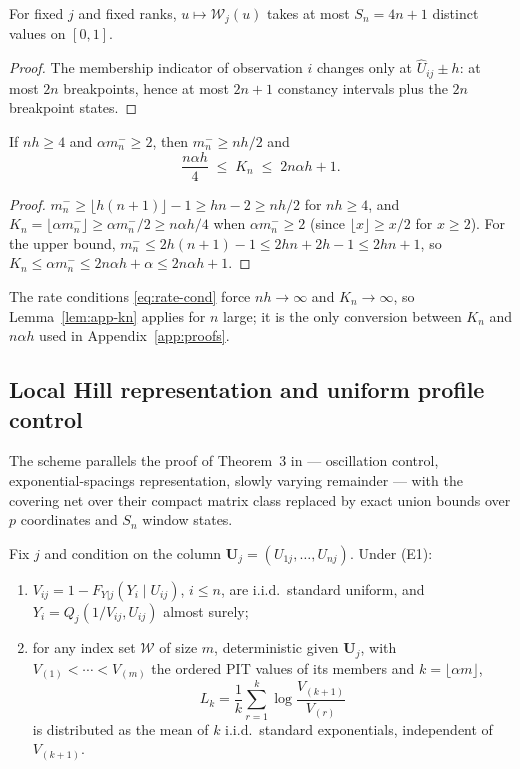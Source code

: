 \begin{lemma}\label{lem:app-states}
For fixed $j$ and fixed ranks, $u\mapsto\mathcal W_j(u)$ takes at most
$S_n=4n+1$ distinct values on $[0,1]$.
\end{lemma}

\begin{proof}
The membership indicator of observation $i$ changes only at
$\widehat U_{ij}\pm h$: at most $2n$ breakpoints, hence at most $2n+1$
constancy intervals plus the $2n$ breakpoint states.
\end{proof}

\begin{lemma}\label{lem:app-kn}
If $nh\ge4$ and $\alpha m_n^-\ge2$, then $m_n^-\ge nh/2$ and
\[
 \frac{n\alpha h}{4}\;\le\;K_n\;\le\;2n\alpha h+1 .
\]
\end{lemma}

\begin{proof}
$m_n^-\ge\lfloor h(n+1)\rfloor-1\ge h n-2\ge nh/2$ for $nh\ge4$, and
$K_n=\lfloor\alpha m_n^-\rfloor\ge\alpha m_n^-/2\ge n\alpha h/4$ when
$\alpha m_n^-\ge2$ (since $\lfloor x\rfloor\ge x/2$ for $x\ge2$).  For the upper bound, $m_n^-\le2h(n+1)-1\le2hn+2h-1\le2hn+1$, so
$K_n\le\alpha m_n^-\le2n\alpha h+\alpha\le2n\alpha h+1$.
\end{proof}

The rate conditions \eqref{eq:rate-cond} force $nh\to\infty$ and
$K_n\to\infty$, so Lemma~\ref{lem:app-kn} applies for $n$ large; it is
the only conversion between $K_n$ and $n\alpha h$ used in
Appendix~\ref{app:proofs}.

\subsection{Local Hill representation and uniform profile control}
\label{app:hill}

The scheme parallels the proof of Theorem~3 in
\citet{gardesPodgorny2025} --- oscillation control,
exponential-spacings representation, slowly varying remainder --- with
the covering net over their compact matrix class replaced by exact union
bounds over $p$ coordinates and $S_n$ window states.

\begin{lemma}\label{lem:app-pit}
Fix $j$ and condition on the column $\bm U_j=(U_{1j},\ldots,U_{nj})$.
Under (E1):
\begin{enumerate}
\item $V_{ij}=1-F_{Y|j}(Y_i\mid U_{ij})$, $i\le n$, are i.i.d.\ standard
uniform, and $Y_i=Q_j(1/V_{ij},U_{ij})$ almost surely;
\item for any index set $\mathcal W$ of size $m$, deterministic given
$\bm U_j$, with $V_{(1)}<\cdots<V_{(m)}$ the ordered PIT values of its
members and $k=\lfloor\alpha m\rfloor$,
\[
 L_k=\frac1k\sum_{r=1}^k\log\frac{V_{(k+1)}}{V_{(r)}}
\]
is distributed as the mean of $k$ i.i.d.\ standard exponentials,
independent of $V_{(k+1)}$.
\end{enumerate}
\end{lemma}


